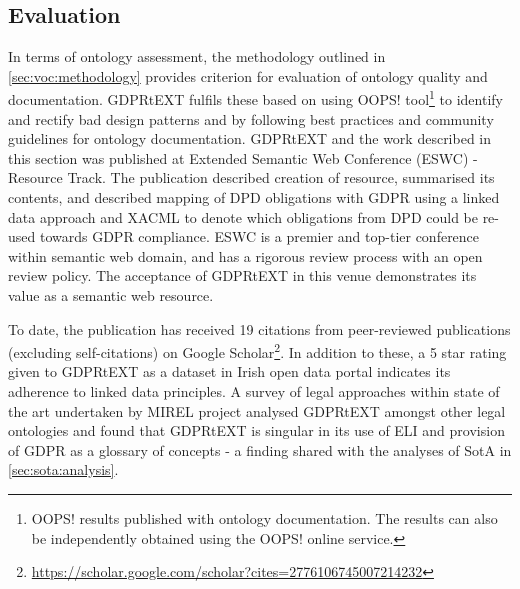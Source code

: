 \subsection{Evaluation}\label{sec:voc:gdprtext:evaluation}
In terms of ontology assessment, the methodology outlined in \autoref{sec:voc:methodology} provides criterion for evaluation of ontology quality and documentation. GDPRtEXT fulfils these based on using OOPS! tool\footnote{OOPS! results published with ontology documentation. The results can also be independently obtained using the OOPS! online service.} to identify and rectify bad design patterns and by following best practices and community guidelines for ontology documentation.
GDPRtEXT and the work described in this section was published \cite{pandit_gdprtext_2018} at Extended Semantic Web Conference (ESWC) - Resource Track. The publication described creation of resource, summarised its contents, and described mapping of DPD obligations with GDPR using a linked data approach and XACML to denote which obligations from DPD could be re-used towards GDPR compliance. 
ESWC is a premier and top-tier conference within semantic web domain, and has a rigorous review process with an open review policy.
The acceptance of GDPRtEXT in this venue demonstrates its value as a semantic web resource.

To date, the publication has received 19 citations from peer-reviewed publications (excluding self-citations) on Google Scholar\footnote{\url{https://scholar.google.com/scholar?cites=2776106745007214232}}.
In addition to these, a 5 star rating given to GDPRtEXT as a dataset in Irish open data portal indicates its adherence to linked data principles.
A survey of legal approaches within state of the art \cite{leone_taking_2019} undertaken by MIREL project analysed GDPRtEXT amongst other legal ontologies and found that GDPRtEXT is singular in its use of ELI and provision of GDPR as a glossary of concepts - a finding shared with the analyses of SotA in \autoref{sec:sota:analysis}.

